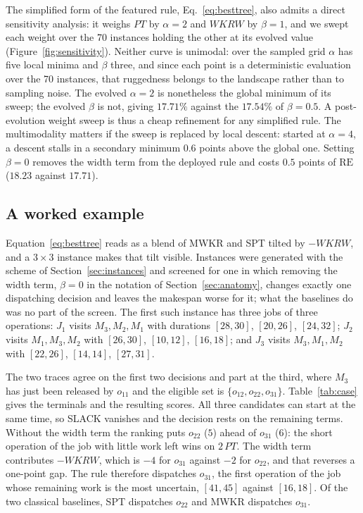 \documentclass[review,authoryear,11pt]{elsarticle}
\newcommand{\rev}[1]{\textcolor{revcolor}{#1}}
\newcommand{\RE}{\mathrm{RE}}
\begin{document}
The simplified form of the featured rule, Eq.~\eqref{eq:besttree}, also
admits a direct sensitivity analysis: it weighs $\mathit{PT}$ by
$\alpha = 2$ and $\mathit{WKRW}$ by $\beta = 1$, and we swept each
weight over the 70 instances holding the other at its evolved value
(Figure~\ref{fig:sensitivity}). Neither curve is unimodal: over the
sampled grid $\alpha$ has five local minima and $\beta$ three, and
since each point is a deterministic evaluation over the 70 instances,
that ruggedness belongs to the landscape rather than to sampling noise.
The evolved $\alpha = 2$ is nonetheless the global minimum of its sweep;
the evolved $\beta$ is not, giving $17.71\%$ against the $17.54\%$ of
$\beta = 0.5$. A post-evolution weight sweep is thus a cheap refinement
for any simplified rule. The multimodality matters if the sweep is
replaced by local descent: started at $\alpha = 4$, a descent stalls in
a secondary minimum $0.6$ points above the global one. Setting
$\beta = 0$ removes the width term from the deployed rule and costs
$0.5$ points of $\RE$ ($18.23$ against $17.71$).



\subsection{A worked example}
\label{sec:case}

\rev{Equation~\eqref{eq:besttree} reads as a blend of MWKR and SPT
tilted by $-\mathit{WKRW}$, and a $3{\times}3$ instance makes that tilt
visible. Instances were generated with the scheme of
Section~\ref{sec:instances} and screened for one in which removing the
width term, $\beta = 0$ in the notation of Section~\ref{sec:anatomy},
changes exactly one dispatching decision and leaves the makespan worse
for it; what the baselines do was no part of the screen. The first such
instance has three jobs of three operations: $J_1$ visits
$M_3, M_2, M_1$ with durations $[28,30]$, $[20,26]$, $[24,32]$; $J_2$
visits $M_1, M_3, M_2$ with $[26,30]$, $[10,12]$, $[16,18]$; and $J_3$
visits $M_3, M_1, M_2$ with $[22,26]$, $[14,14]$, $[27,31]$.}

\rev{The two traces agree on the first two decisions and part at the
third, where $M_3$ has just been released by $o_{11}$ and the eligible
set is $\{o_{12}, o_{22}, o_{31}\}$. Table~\ref{tab:case} gives the
terminals and the resulting scores. All three candidates can start at
the same time, so SLACK vanishes and the decision rests on the
remaining terms. Without the width term the ranking puts $o_{22}$
($5$) ahead of $o_{31}$ ($6$): the short operation of the job with
little work left wins on $2\,\mathit{PT}$. The width term contributes
$-\mathit{WKRW}$, which is $-4$ for $o_{31}$ against $-2$ for $o_{22}$,
and that reverses a one-point gap. The rule therefore dispatches
$o_{31}$, the first operation of the job whose remaining work is the
most uncertain, $[41,45]$ against $[16,18]$. Of the two classical
baselines, SPT dispatches $o_{22}$ and MWKR dispatches $o_{31}$.}
\end{document}
